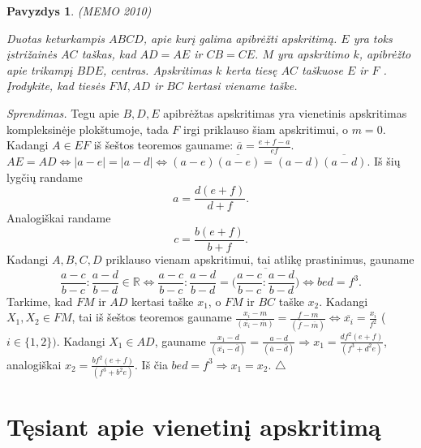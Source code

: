 \documentclass[11pt,a4paper,twoside]{book}
\newenvironment{sprendimas}{\noindent \textit{Sprendimas.}}{\hfill $\triangle$}
\newcounter{foo}[subsection]
\newtheorem{pavnr}[foo]{Pavyzdys}
\theoremstyle{definition} \newtheorem*{api}{Apibrėžimas}
\theoremstyle{remark} \newtheorem*{pastaba}{Pastaba}
\begin{document}
\begin{pavnr} 
(MEMO 2010)

Duotas keturkampis $ABCD$, apie kurį galima apibrėžti apskritimą. $E$ yra toks įstrižainės $AC$
taškas, kad $AD = AE$ ir $CB = CE$. $M$ yra apskritimo $k$, apibrėžto apie trikampį $BDE$,
centras. Apskritimas $k$ kerta tiesę $AC$ taškuose $E$ ir $F$ . Įrodykite, kad tiesės $FM, AD$ ir $BC$ kertasi viename taške.
\end{pavnr}
\begin{sprendimas}
Tegu apie $B, D, E$ apibrėžtas apskritimas yra vienetinis apskritimas kompleksinėje plokštumoje, tada $F$ irgi priklauso šiam apskritimui, o $m=0$. Kadangi $A\in EF$ iš šeštos teoremos gauname: $\overline{a}=\frac{e+f-a}{ef}$. $AE = AD \Leftrightarrow |a-e|=|a-d| \Leftrightarrow (a-e)\overline{(a-e)}=(a-d)\overline{(a-d)}$. Iš šių lygčių randame
$$a=\frac{d(e+f)}{d+f}.$$
Analogiškai randame
$$c=\frac{b(e+f)}{b+f}.$$
Kadangi $A, B, C, D$ priklauso vienam apskritimui, tai atlikę prastinimus, gauname
$$\frac{a-c}{b-c}:\frac{a-d}{b-d}\in \mathbb{R} \Leftrightarrow \frac{a-c}{b-c}:\frac{a-d}{b-d}= \overline{\bigg(\frac{a-c}{b-c}:\frac{a-d}{b-d}\bigg)} \Leftrightarrow bed=f^3.$$
Tarkime, kad $FM$ ir $AD$ kertasi taške $x_1$, o $FM$ ir $BC$ taške $x_2$. Kadangi $X_1, X_2 \in FM$, tai iš šeštos teoremos gauname $\frac{x_i-m}{(\overline{x_i}-\overline{m})}=\frac{f-m}{(\overline{f}-\overline{m})} \Leftrightarrow          \overline{x_i}=\frac{x_i}{f^2}$ ($i \in \{1, 2\})$.
Kadangi $X_1 \in AD$, gauname $\frac{x_1-d}{(\overline{x_1}-\overline{d})}=\frac{a-d}{(\overline{a}-\overline{d})} \Rightarrow x_1=\frac{df^2(e+f)}{(f^3+d^2e)}$,
analogiškai $x_2=\frac{bf^2(e+f)}{(f^3+b^2e)}$.
Iš čia $bed=f^3 \Rightarrow x_1=x_2.$
\end{sprendimas}


























\chapter{Tęsiant apie vienetinį apskritimą}
\end{document}
